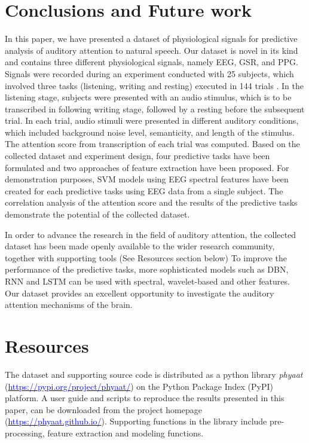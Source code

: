 \documentclass{article}
\begin{document}
\section{Conclusions and Future work}
\label{S:Conclusion}
In this paper, we have presented a dataset of physiological signals for predictive analysis of auditory attention to natural speech. Our dataset is novel in its kind and contains three different physiological signals, namely EEG, GSR, and PPG. Signals were recorded during an experiment conducted with 25 subjects, which involved three tasks (listening, writing and resting) executed in 144 trials . In the listening stage, subjects were presented with an audio stimulus, which is to be transcribed in following writing stage, followed by a resting before the subsequent trial. In each trial, audio stimuli were presented in different auditory conditions, which included background noise level, semanticity, and length of the stimulus. The attention score from transcription of each trial was computed. Based on the collected dataset and experiment design, four predictive tasks have been formulated and two approaches of feature extraction have been proposed. For demonstration purposes, SVM models using EEG spectral features have been created for each predictive tasks using EEG data from a single subject. The correlation analysis of the attention score and the results of the predictive tasks demonstrate the potential of the collected dataset.

In order to advance the research in the field of auditory attention, the collected dataset has been made openly available to the wider research community, together with supporting tools (See Resources section below) To improve the performance of the predictive tasks, more sophisticated models such as DBN, RNN and LSTM can be used with spectral, wavelet-based and other features. Our dataset provides an excellent opportunity to investigate the auditory attention mechanisms of the brain. 

\section*{Resources}\label{S:Resources}
The dataset and supporting source code is distributed as a python library \textit{phyaat} (\href{https://pypi.org/project/phyaat/}{\textcolor{blue}{https://pypi.org/project/phyaat/}}) on the Python Package Index (PyPI) platform. A user guide and scripts to reproduce the results presented in this paper, can be downloaded from the project homepage (\href{https://phyaat.github.io/}{\textcolor{blue}{https://phyaat.github.io/}}). Supporting functions in the library include pre-processing, feature extraction and modeling functions.



\end{document}
